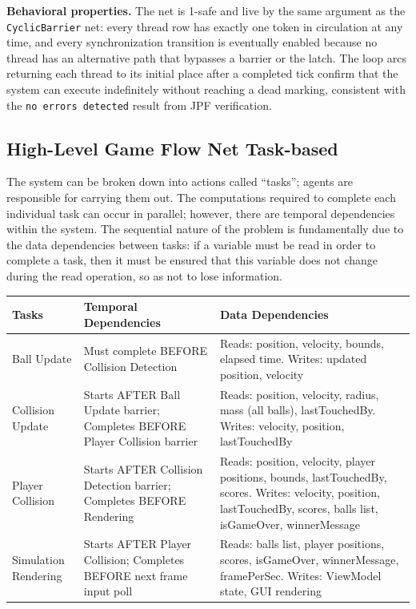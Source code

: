 \documentclass[12pt,a4paper]{article}
\begin{document}
\textbf{Behavioral properties.} The net is 1-safe and live by the same argument
as the \texttt{CyclicBarrier} net: every thread row has exactly one token in
circulation at any time, and every synchronization transition is eventually
enabled because no thread has an alternative path that bypasses a barrier or the
latch. The loop arcs returning each thread to its initial place after a completed
tick confirm that the system can execute indefinitely without reaching a dead
marking, consistent with the \texttt{no errors detected} result from JPF
verification.

\subsection{High-Level Game Flow Net Task-based}
The system can be broken down into actions called “tasks”; agents are responsible 
for carrying them out. The computations required to complete each 
individual task can occur in parallel; however, there are temporal
 dependencies within the system. The sequential nature of the problem is 
 fundamentally due to the data dependencies between tasks: if a variable 
 must be read in order to complete a task, then it must be ensured that this 
 variable does not change during the read operation, so as not to lose information.

\vspace{1.5em}

\begin{tabular}{ |p{5cm}|p{5cm}|p{5cm}|  }
\hline
Tasks & Temporal Dependencies & Data Dependencies \\
\hline
Ball Update & Must complete BEFORE Collision Detection & Reads: position, velocity, bounds, elapsed time. Writes: updated position, velocity \\
\hline
Collision Update & Starts AFTER Ball Update barrier; Completes BEFORE Player Collision barrier   & Reads: position, velocity, radius, mass (all balls), lastTouchedBy. Writes: velocity, position, lastTouchedBy \\
\hline
Player Collision & Starts AFTER Collision Detection barrier; Completes BEFORE Rendering & Reads: position, velocity, player positions, bounds, lastTouchedBy, scores. Writes: velocity, position, lastTouchedBy, scores, balls list, isGameOver, winnerMessage \\
\hline
Simulation Rendering    & Starts AFTER Player Collision; Completes BEFORE next frame input poll & Reads: balls list, player positions, scores, isGameOver, winnerMessage, framePerSec. Writes: ViewModel state, GUI rendering \\
\hline
\end{tabular}
\end{document}

